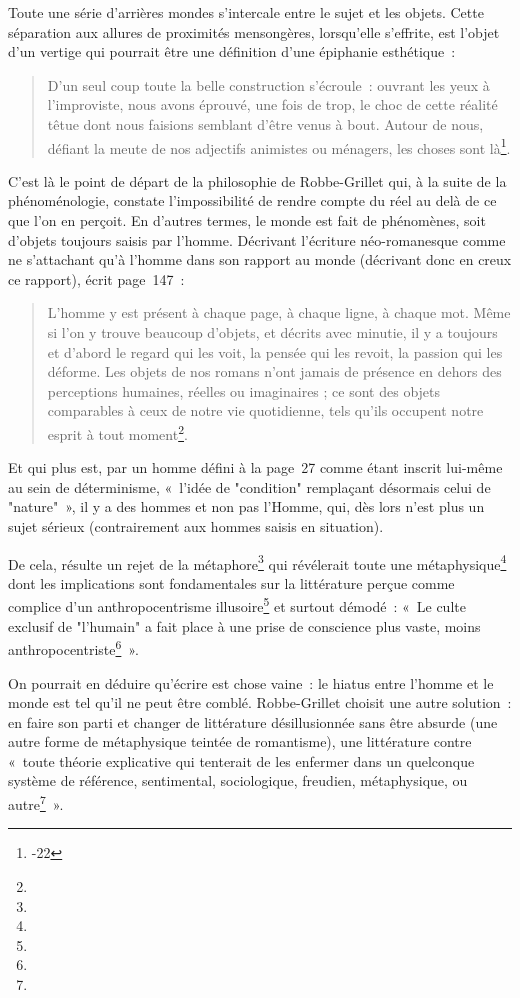 Toute une série d'arrières mondes s'intercale entre le sujet et les objets. Cette séparation aux allures de proximités mensongères, lorsqu'elle s'effrite, est l'objet d'un vertige qui pourrait être une définition d'une épiphanie esthétique~:
\begin{quote}
    D’un seul coup toute la belle construction s’écroule~: ouvrant les yeux à l’improviste, nous avons éprouvé, une fois de trop, le choc de cette réalité têtue dont nous faisions semblant d’être venus à bout. Autour de nous, défiant la meute de nos adjectifs animistes ou ménagers, les choses sont là\footnote{-22}. 
\end{quote}
C'est là le point de départ de la philosophie de Robbe-Grillet qui, à la suite de la phénoménologie, constate l'impossibilité de rendre compte du réel au delà de ce que l'on en perçoit. En d'autres termes, le monde est fait de phénomènes, soit d'objets toujours saisis par l'homme. Décrivant l'écriture néo-romanesque comme ne s'attachant qu'à l'homme dans son rapport au monde (décrivant donc en creux ce rapport), \robbe{} écrit page~147~:
\begin{quote}
    L’homme y est présent à chaque page, à chaque ligne, à chaque mot. Même si l’on y trouve beaucoup d’objets, et décrits avec minutie, il y a toujours et d’abord le regard qui les voit, la pensée qui les revoit, la passion qui les déforme. Les objets de nos romans n’ont jamais de présence en dehors des perceptions humaines, réelles ou imaginaires ; ce sont des objets comparables à ceux de notre vie quotidienne, tels qu’ils occupent notre esprit à tout moment\footnote{}.
\end{quote}

Et qui plus est, par un homme défini à la page~27 comme étant inscrit lui-même au sein de déterminisme, «~l'idée de "condition" remplaçant désormais celui de "nature"~», il y a des hommes et non pas l'Homme, qui, dès lors n'est plus un sujet sérieux (contrairement aux hommes saisis en situation).


De cela, résulte un rejet de la métaphore\footnote{} qui révélerait toute une métaphysique\footnote{} dont les implications sont fondamentales sur la littérature perçue comme complice d'un anthropocentrisme illusoire\footnote{} et surtout démodé~: «~Le culte exclusif de "l'humain" a fait place à une prise de conscience plus vaste, moins anthropocentriste\footnote{}~».


On pourrait en déduire qu'écrire est chose vaine~: le hiatus entre l'homme et le monde est tel qu'il ne peut être comblé. Robbe-Grillet choisit une autre solution~: en faire son parti et changer de littérature désillusionnée sans être absurde (une autre forme de métaphysique teintée de romantisme), une littérature contre «~toute théorie explicative qui tenterait de les enfermer dans un quelconque système de référence, sentimental, sociologique, freudien, métaphysique, ou autre\footnote{}~».



